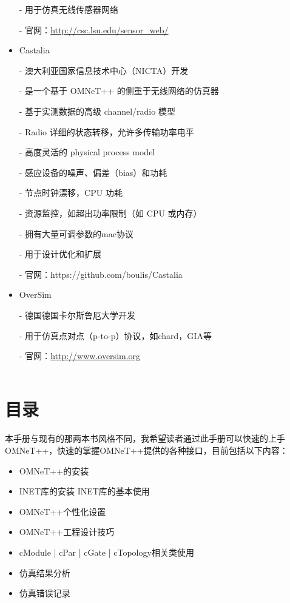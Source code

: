 \begin{itemize}
- 用于仿真无线传感器网络

- 官网：\url{http://csc.lsu.edu/sensor_web/}

\item Castalia

- 澳大利亚国家信息技术中心（NICTA）开发

- 是一个基于 OMNeT++ 的侧重于无线网络的仿真器

- 基于实测数据的高级 channel/radio 模型

- Radio 详细的状态转移，允许多传输功率电平

- 高度灵活的 physical process model

- 感应设备的噪声、偏差（bias）和功耗

- 节点时钟漂移，CPU 功耗

- 资源监控，如超出功率限制（如 CPU 或内存）

- 拥有大量可调参数的mac协议

- 用于设计优化和扩展

- 官网：https://github.com/boulis/Castalia


\item OverSim

- 德国德国卡尔斯鲁厄大学开发

- 用于仿真点对点（p-to-p）协议，如chard，GIA等

- 官网：\url{http://www.oversim.org} \\ \\

\end{itemize}





\section{目录}

本手册与现有的那两本书风格不同，我希望读者通过此手册可以快速的上手OMNeT++，快速的掌握OMNeT++提供的各种接口，目前包括以下内容：

\begin{itemize}
	\item OMNeT++的安装
	\item INET库的安装 INET库的基本使用
	\item OMNeT++个性化设置
	\item OMNeT++工程设计技巧
	\item cModule | cPar | cGate | cTopology相关类使用
	\item 仿真结果分析
	\item 仿真错误记录
\end{itemize}



